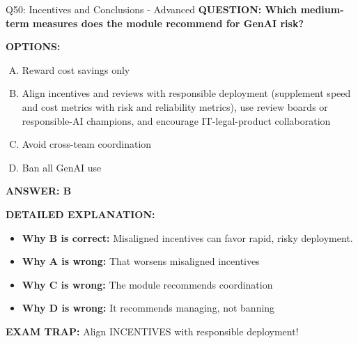 \documentclass[8pt]{beamer}
\begin{document}
\begin{frame}[shrink=6]{Q50: Incentives and Conclusions - Advanced}
\fontsize{6.5}{7.5}\selectfont
\textbf{QUESTION: Which medium-term measures does the module recommend for GenAI risk?}

\vspace{0.1cm}
\textbf{OPTIONS:}
\begin{enumerate}[A.]
\item Reward cost savings only
\item Align incentives and reviews with responsible deployment (supplement speed and cost metrics with risk and reliability metrics), use review boards or responsible-AI champions, and encourage IT-legal-product collaboration
\item Avoid cross-team coordination
\item Ban all GenAI use
\end{enumerate}

\vspace{0.1cm}
\textcolor{myblue}{\textbf{ANSWER: B}}

\vspace{0.1cm}
\textbf{DETAILED EXPLANATION:}
\begin{itemize}
\item \textbf{Why B is correct:} Misaligned incentives can favor rapid, risky deployment.
\item \textbf{Why A is wrong:} That worsens misaligned incentives
\item \textbf{Why C is wrong:} The module recommends coordination
\item \textbf{Why D is wrong:} It recommends managing, not banning
\end{itemize}

\textcolor{myred}{\textbf{EXAM TRAP:}} Align INCENTIVES with responsible deployment!
\end{frame}
\end{document}
